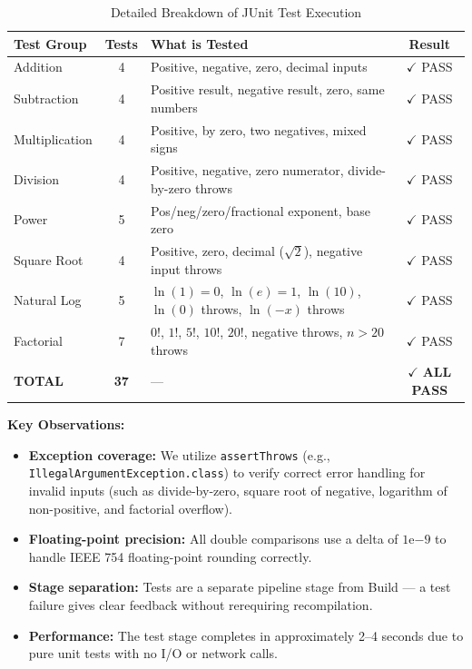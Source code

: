 \documentclass[12pt]{article}
\begin{document}
\begin{table}[H]
\centering
\begin{tabular}{|l|c|p{5.5cm}|c|}
\hline
\textbf{Test Group} & \textbf{Tests} & \textbf{What is Tested} & \textbf{Result} \\
\hline
Addition       & 4  & Positive, negative, zero, decimal inputs                                    & $\checkmark$ PASS \\
\hline
Subtraction    & 4  & Positive result, negative result, zero, same numbers                        & $\checkmark$ PASS \\
\hline
Multiplication & 4  & Positive, by zero, two negatives, mixed signs                               & $\checkmark$ PASS \\
\hline
Division       & 4  & Positive, negative, zero numerator, divide-by-zero throws                   & $\checkmark$ PASS \\
\hline
Power          & 5  & Pos/neg/zero/fractional exponent, base zero                                 & $\checkmark$ PASS \\
\hline
Square Root    & 4  & Positive, zero, decimal ($\sqrt{2}$), negative input throws                 & $\checkmark$ PASS \\
\hline
Natural Log    & 5  & $\ln(1)=0$, $\ln(e)=1$, $\ln(10)$, $\ln(0)$ throws, $\ln(-x)$ throws       & $\checkmark$ PASS \\
\hline
Factorial      & 7  & $0!$, $1!$, $5!$, $10!$, $20!$, negative throws, $n>20$ throws              & $\checkmark$ PASS \\
\hline
\textbf{TOTAL} & \textbf{37} & ---                                                                  & $\checkmark$ \textbf{ALL PASS} \\
\hline
\end{tabular}
\caption{Detailed Breakdown of JUnit Test Execution}
\end{table}

\textbf{Key Observations:}
\begin{itemize}
    \item \textbf{Exception coverage:} We utilize \texttt{assertThrows} (e.g., \texttt{IllegalArgumentException}\allowbreak\texttt{.class}) to verify correct error handling for invalid inputs (such as divide-by-zero, square root of negative, logarithm of non-positive, and factorial overflow).
    \item \textbf{Floating-point precision:} All double comparisons use a delta of $1\mathrm{e}{-9}$ to handle IEEE 754 floating-point rounding correctly.
    \item \textbf{Stage separation:} Tests are a separate pipeline stage from Build --- a test failure gives clear feedback without rerequiring recompilation.
    \item \textbf{Performance:} The test stage completes in approximately 2--4 seconds due to pure unit tests with no I/O or network calls.
\end{itemize}
\end{document}
